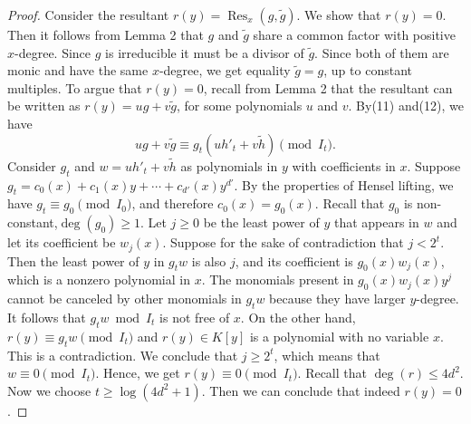 \documentclass[10pt,a4paper]{article}
\newcommand{\Res}{\operatorname{Res}}
\begin{document}
\begin{proof}
Consider the resultant $r(y)=\Res_x(g,\widetilde g)$. We show that $r(y)=0$. Then it follows from Lemma 2 that $g$ and $\widetilde g$ share a common factor with positive $x$-degree. Since $g$ is irreducible it must be a divisor of $\widetilde g$. Since both of them are monic and have the same $x$-degree, we get equality $\widetilde g=g$, up to constant multiples.
To argue that $r(y)=0$, recall from Lemma 2 that the resultant can be written as $r(y)=ug+v\widetilde g$, for some polynomials $u$ and $v$. By(11) and(12), we have
\[ug+v\widetilde g\equiv g_t(uh'_t+v\widetilde h)\pmod{I_t}.\]
Consider $g_t$ and $w=uh'_t+v\widetilde h$ as polynomials in $y$ with coefficients in $x$. Suppose $g_t=c_0(x)+c_1(x)y+\cdots+c_{d'}(x)y^{d'}$. By the properties of Hensel lifting, we have $g_t\equiv g_0\pmod{I_0}$, and therefore $c_0(x)=g_0(x)$. Recall that $g_0$ is non-constant,$\deg(g_0)\geq1$.
Let $j\geq0$ be the least power of $y$ that appears in $w$ and let its coefficient be $w_j(x)$. Suppose for the sake of contradiction that $j<2^t$. Then the least power of $y$ in $g_tw$ is also $j$, and its coefficient is $g_0(x)w_j(x)$, which is a nonzero polynomial in $x$.
The monomials present in $g_0(x)w_j(x)y^j$ cannot be canceled by other monomials in $g_tw$ because they have larger $y$-degree. It follows that $g_tw\bmod I_t$ is not free of $x$. On the other hand,$r(y)\equiv g_tw\pmod{I_t}$ and $r(y)\in K[y]$ is a polynomial with no variable $x$. This is a contradiction.
We conclude that $j\geq2^t$, which means that $w\equiv0\pmod{I_t}$. Hence, we get $r(y)\equiv0\pmod{I_t}$. Recall that $\deg(r)\leq4d^2$. Now we choose $t\geq\log(4d^2+1)$. Then we can conclude that indeed $r(y)=0$.
\end{proof}
\end{document}
